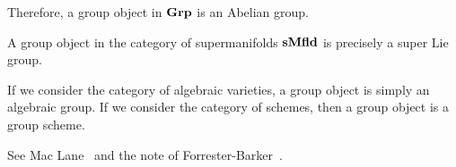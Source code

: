 \begin{node}
\begin{node}[Examples]
\begin{node}
Therefore, a group object in $\mathbf{Grp}$ is an Abelian group.
\end{node}

\begin{node}\label{internal-000F}%
A group object in the category of supermanifolds $\mathbf{s}\mathbf{Mfld}$ is precisely a
super Lie group.
\end{node}

\begin{node}\label{internal-000G}%
If we consider the category of algebraic varieties, a group object is
simply an algebraic group. If we consider the category of schemes, then
a group object is a group scheme.
\end{node}
\end{node} %

\begin{node}[References]\label{internal-0008}%
See Mac Lane~\cite[III\S6]{mac1998categories} and
the note of Forrester-Barker~\cite{forresterbarker2002group}.
\end{node}
\end{node}

